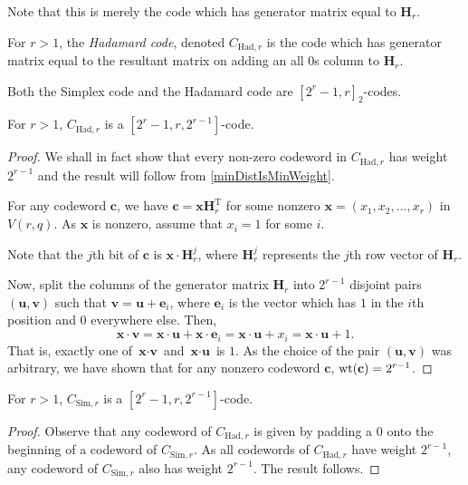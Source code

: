 Note that this is merely the code which has generator matrix equal to $\textbf{H}_r$.

\begin{definition}
    For $r>1$, the \textit{Hadamard code}, denoted $C_{\text{Had},r}$ is the code which has generator matrix equal to the resultant matrix on adding an all $0$s column to $\textbf{H}_r$.
\end{definition}

Both the Simplex code and the Hadamard code are $[2^r-1,r]_2$-codes.

\begin{theorem}
    For $r>1$, $C_{\text{Had},r}$ is a $[2^r-1,r,2^{r-1}]$-code.
\end{theorem}
\begin{proof}
    We shall in fact show that every non-zero codeword in $C_{\text{Had},r}$ has weight $2^{r-1}$ and the result will follow from \ref{minDistIsMinWeight}.
    
    For any codeword $\textbf{c}$, we have $\textbf{c}=\textbf{x}\textbf{H}_r^\text{T}$ for some nonzero $\textbf{x}=(x_1,x_2,\ldots,x_r)$ in $V(r,q)$. As $\textbf{x}$ is nonzero, assume that $x_i=1$ for some $i$.
    
    Note that the $j$th bit of $\textbf{c}$ is $\textbf{x}\cdot \textbf{H}_r^j$, where $\textbf{H}_r^j$ represents the $j$th row vector of $\textbf{H}_r$.
    
    Now, split the columns of the generator matrix $\textbf{H}_r$ into $2^{r-1}$ disjoint pairs $(\textbf{u},\textbf{v})$ such that $\textbf{v}=\textbf{u}+\textbf{e}_i$, where $\textbf{e}_i$ is the vector which has $1$ in the $i$th position and $0$ everywhere else. Then,
    $$
    \textbf{x}\cdot\textbf{v}
    =\textbf{x}\cdot\textbf{u}+\textbf{x}\cdot\textbf{e}_i
    =\textbf{x}\cdot\textbf{u}+x_i
    =\textbf{x}\cdot\textbf{u}+1.
    $$
    That is, exactly one of $\textbf{x}\cdot\textbf{v}$ and $\textbf{x}\cdot\textbf{u}$ is $1$. As the choice of the pair $(\textbf{u},\textbf{v})$ was arbitrary, we have shown that for any nonzero codeword $\textbf{c}$, $\operatorname{wt}(\textbf{c})=2^{r-1}$.
\end{proof}

\begin{theorem}
    For $r>1$, $C_{\text{Sim},r}$ is a $[2^r-1,r,2^{r-1}]$-code.
\end{theorem}
\begin{proof}
    Observe that any codeword of $C_{\text{Had},r}$ is given by padding a $0$ onto the beginning of a codeword of $C_{\text{Sim},r}$. As all codewords of $C_{\text{Had},r}$ have weight $2^{r-1}$, any codeword of $C_{\text{Sim},r}$ also has weight $2^{r-1}$. The result follows.
\end{proof}


\clearpage